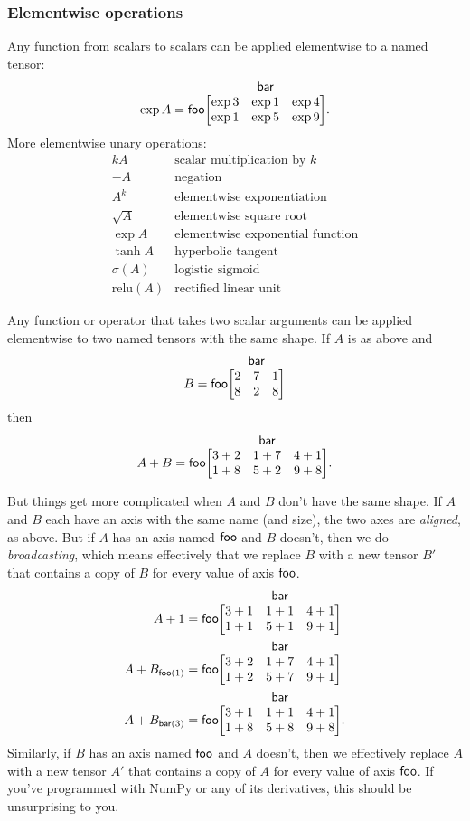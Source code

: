 \documentclass{article}
\makeatletter
\newcommand{\nmatrix}[3]{\name{#1}\begin{array}[b]{@{}c@{}}\name{#2}\\\begin{bmatrix}#3\end{bmatrix}\end{array}}
\makeatother
\begin{document}
\subsubsection{Elementwise operations}

Any function from scalars to scalars can be applied elementwise to a named tensor:
\begin{equation*}
\exp A = \nmatrix{foo}{bar}{
  \exp 3 & \exp 1 & \exp 4 \\
  \exp 1 & \exp 5 & \exp 9
}.
\end{equation*}
More elementwise unary operations:
\[\begin{array}{cl}
kA & \text{scalar multiplication by $k$} \\
-A & \text{negation} \\
A^k & \text{elementwise exponentiation} \\
\sqrt{A} &\text{elementwise square root} \\
\exp A & \text{elementwise exponential function} \\
\tanh A & \text{hyperbolic tangent} \\
\sigma(A) & \text{logistic sigmoid} \\
\text{relu}(A) & \text{rectified linear unit}
\end{array}\]

Any function or operator that takes two scalar arguments can be applied elementwise to two named tensors with the same shape. If $A$ is as above and
\begin{equation*}
B = \nmatrix{foo}{bar}{
  2 & 7 & 1 \\
  8 & 2 & 8
}
\end{equation*}
then
\begin{equation*}
A + B = \nmatrix{foo}{bar}{
  3+2 & 1+7 & 4+1 \\
  1+8 & 5+2 & 9+8
}.
\end{equation*}

But things get more complicated when $A$ and $B$ don't have the same shape. If $A$ and $B$ each have an axis with the same name (and size), the two axes are \emph{aligned}, as above. But if $A$ has an axis named $\mathsf{foo}$ and $B$ doesn't, then we do \emph{broadcasting}, which means effectively that we replace $B$ with a new tensor $B'$ that contains a copy of $B$ for every value of axis $\mathsf{foo}$.
\begin{align*}
A + 1 &= \nmatrix{foo}{bar}{
  3+1 & 1+1 & 4+1 \\
  1+1 & 5+1 & 9+1
} \\
A + B_{\nidx{foo}{1}} &= \nmatrix{foo}{bar}{
  3+2 & 1+7 & 4+1 \\
  1+2 & 5+7 & 9+1
} \\
A + B_{\nidx{bar}{3}} &= \nmatrix{foo}{bar}{
  3+1 & 1+1 & 4+1 \\
  1+8 & 5+8 & 9+8
}.
\end{align*}
Similarly, if $B$ has an axis named $\mathsf{foo}$ and $A$ doesn't, then we effectively replace $A$ with a new tensor $A'$ that contains a copy of $A$ for every value of axis $\mathsf{foo}$. If you've programmed with NumPy or any of its derivatives, this should be unsurprising to you.
\end{document}
